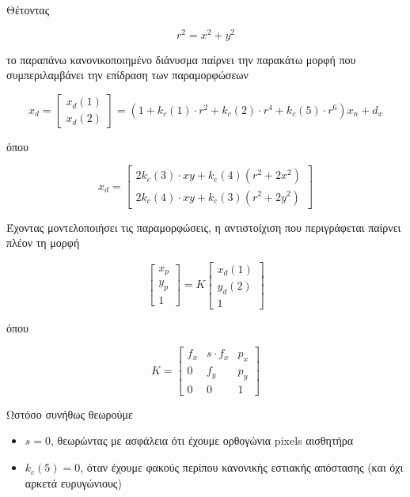 Θέτοντας

\begin{equation}
r^{2}=x^{2}+y^{2}
\end{equation}

το παραπάνω κανονικοποιημένο διάνυσμα παίρνει την παρακάτω μορφή που συμπεριλαμβάνει την επίδραση των παραμορφώσεων


\begin{equation}
x_{d}=
\begin{bmatrix}
x_{d}(1)\\
x_{d}(2)
\end{bmatrix}
=
(1+k_{c}(1)\cdot r^{2}+k_{c}(2)\cdot r^{4}+k_{c}(5)\cdot r^{6})x_{n}+d_{x}
\end{equation}


όπου 

\begin{equation}
x_{d}=
\begin{bmatrix}
2k_{c}(3)\cdot xy+k_{c}(4)(r^{2}+2x^{2})\\
2k_{c}(4)\cdot xy+k_{c}(3)(r^{2}+2y^{2})
\end{bmatrix}
\end{equation}

Έχοντας μοντελοποιήσει τις παραμορφώσεις, η αντιστοίχιση που περιγράφεται παίρνει πλέον τη μορφή

\begin{equation}
\begin{bmatrix}
x_{p}\\
y_{p}\\
1
\end{bmatrix}
=
K
\begin{bmatrix}
x_{d}(1)\\
y_{d}(2)\\
1
\end{bmatrix}
\end{equation}


όπου 

\begin{equation}
K=
\begin{bmatrix}
f_{x} & s\cdot f_{x} & p_{x}\\
0 & f_{y} & p_{y}\\
0 & 0 & 1
\end{bmatrix}
\end{equation}

Ωστόσο συνήθως θεωρούμε 

\begin{itemize}
\item $s=0$, θεωρώντας με ασφάλεια ότι έχουμε ορθογώνια pixels αισθητήρα
\item $k_{c}(5)=0$, όταν έχουμε φακούς περίπου κανονικής εστιακής απόστασης (και όχι αρκετά ευρυγώνιους)
\end{itemize}

